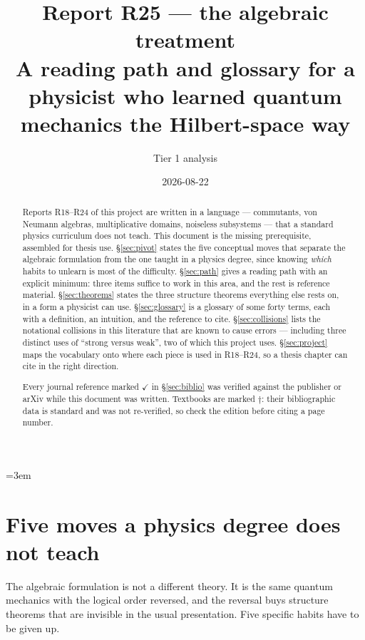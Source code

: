 \documentclass[11pt]{article}
\title{\textbf{Report R25 --- the algebraic treatment}\\
\large A reading path and glossary for a physicist who learned quantum
mechanics the Hilbert-space way}
\author{Tier 1 analysis}
\date{2026-08-22}
\theoremstyle{plain}
\theoremstyle{remark}
\begin{document}
\sloppy
\emergencystretch=3em
\maketitle

\begin{abstract}
Reports R18--R24 of this project are written in a language --- commutants, von
Neumann algebras, multiplicative domains, noiseless subsystems --- that a
standard physics curriculum does not teach. This document is the missing
prerequisite, assembled for thesis use. \S\ref{sec:pivot} states the five
conceptual moves that separate the algebraic formulation from the one taught in
a physics degree, since knowing \emph{which} habits to unlearn is most of the
difficulty. \S\ref{sec:path} gives a reading path with an explicit minimum:
three items suffice to work in this area, and the rest is reference material.
\S\ref{sec:theorems} states the three structure theorems everything else rests
on, in a form a physicist can use. \S\ref{sec:glossary} is a glossary of some
forty terms, each with a definition, an intuition, and the reference to cite.
\S\ref{sec:collisions} lists the notational collisions in this literature that
are known to cause errors --- including three distinct uses of ``strong versus
weak'', two of which this project uses. \S\ref{sec:project} maps the vocabulary
onto where each piece is used in R18--R24, so a thesis chapter can cite in the
right direction.

Every journal reference marked $\checkmark$ in \S\ref{sec:biblio} was verified
against the publisher or arXiv while this document was written. Textbooks are
marked $\dagger$: their bibliographic data is standard and was not
re-verified, so check the edition before citing a page number.
\end{abstract}

\tableofcontents

\section{Five moves a physics degree does not teach}
\label{sec:pivot}

The algebraic formulation is not a different theory. It is the same quantum
mechanics with the logical order reversed, and the reversal buys structure
theorems that are invisible in the usual presentation. Five specific habits
have to be given up.
\end{document}
